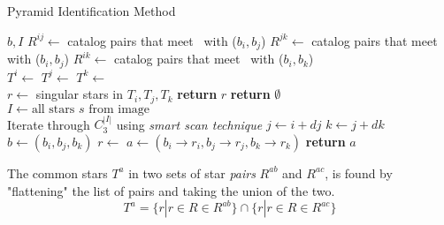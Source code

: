 \begin{algorithm} 
    \caption{Pyramid Identification Method} \label{algorithm:pyramidIdentification}
    \begin{algorithmic}[1]
         {$b, I$}
        \State $R^{ij} \gets$ catalog pairs that meet~ with ($b_i, b_j$)
        \State $R^{jk} \gets$ catalog pairs that meet~ with ($b_i, b_j$)
        \State $R^{ik} \gets$ catalog pairs that meet~ with ($b_i, b_k$)
        \\
        \State $T^i \gets $ 
        \State $T^j \gets $ 
        \State $T^k \gets $ 
        \\
        \State $r \gets $ singular stars in $T_i, T_j, T_k$
        \State \textbf{return} $r$
        \EndIf
        \EndIf
        \State \textbf{return} $\emptyset$
        \EndFunction
        \\
        \State $I \gets \text{all stars } s \text{ from image}$
        \\
        \LineComment Iterate through $C^{|I|}_3$ using \textit{smart scan technique}
        \State $j \gets i + dj$
        \State $k \gets j + dk$
        \\
        \State $b \gets (b_i, b_j, b_k)$
        \State $r \gets$ 
        \State $a \gets (b_i \rightarrow r_i, b_j \rightarrow r_j, b_k \rightarrow r_k)$
        \State \textbf{return} $a$
        \EndIf
        \EndFor
        \EndFor
        \EndFor
        \EndProcedure
    \end{algorithmic}
\end{algorithm}

The common stars $T^a$ in two sets of star \textit{pairs} $R^{ab}$ and $R^{ac}$, is found by "flattening" the list of
pairs and taking the union of the two.
\begin{equation}
    \label{eq:commonStarsPyramid}
    T^a = \{ r | r \in R \in R^{ab} \} \cap \{ r | r \in R \in R^{ac} \}
\end{equation}

